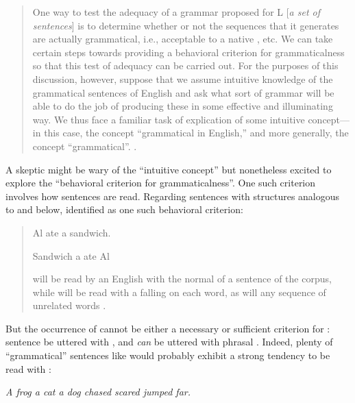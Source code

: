 \begin{quote}
One way to test the adequacy of a grammar proposed for L [\textit{a set of sentences}] is to determine whether or not the sequences that it generates are actually grammatical, i.e., acceptable to a native , etc. We can take certain steps towards providing a behavioral criterion for grammaticalness so that this test of adequacy can be carried out. For the purposes of this discussion, however, suppose that we assume intuitive knowledge of the grammatical sentences of English and ask what sort of grammar will be able to do the job of producing these in some effective and illuminating way. We thus face a familiar task of explication of some intuitive concept—in this case, the concept “grammatical in English,” and more generally, the concept “grammatical”. \citep[13]{Chomsky1957}.
\end{quote}

  A skeptic might be wary of the “intuitive concept” but nonetheless excited to explore the “behavioral criterion for grammaticalness”. One such criterion involves how sentences are read. Regarding sentences with structures analogous to  and  below, \citet{Chomsky1956} identified  as one such behavioral criterion:

\begin{quote} 
  
\ea\label{ex:6:1}
Al ate a sandwich.
\z


\ea\label{ex:6:2}
Sandwich a ate Al%
\z

 will be read by an English  with the normal  of a sentence of the corpus, while  will be read with a falling  on each word, as will any sequence of unrelated words \citep[114]{Chomsky1956}.

\end{quote}


  But the occurrence of  cannot be either a necessary or sufficient criterion for : sentence   be uttered with , and  \textit{can} be uttered with phrasal . Indeed, plenty of “grammatical” sentences like  would probably exhibit a strong tendency to be read with : 

\ea\label{ex:6:3}
\textit{A frog a cat a dog chased scared jumped far.}
\z

